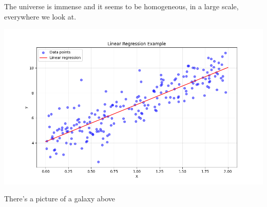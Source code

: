\documentclass{article}
\begin{document}
The universe is immense and it seems to be homogeneous, 
in a large scale, everywhere we look at.

\includegraphics{linear_regression_plot.png}

There's a picture of a galaxy above
\end{document}
